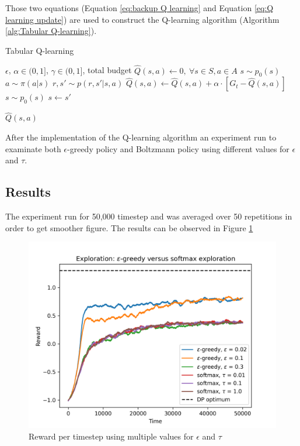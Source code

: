 \documentclass{article}
\begin{document}
Those two equations (Equation \ref{eq:backup Q learning} and Equation \ref{eq:Q learning update}) are used 
to construct the Q-learning algorithm (Algorithm \ref{alg:Tabular Q-learning}). 

\begin{algorithm}[h]
    \caption{Tabular Q-learning}
    \label{alg:Tabular Q-learning}
 \begin{algorithmic}
     $\epsilon $, $\alpha \in (0,1]$, $\gamma \in (0,1]$, total budget
    \STATE $\hat{Q}(s,a) \leftarrow 0,\ \forall s \in S, a \in A$
    \STATE $s \sim p_0(s)$
        \STATE $a \sim \pi(a|s)$
        \STATE $r,s' \sim p(r,s'|s,a)$
        \STATE $\hat{Q}(s,a) \leftarrow \hat{Q}(s,a) + \alpha \cdot [G_t - \hat{Q}(s,a)]$
        \STATE $s \sim  p_0(s)$
        \ELSE 
        \STATE $s \leftarrow s'$
        \ENDIF
        \ENDWHILE
    
     $\hat{Q}(s,a)$
 \end{algorithmic}
\end{algorithm}
 
After the implementation of the Q-learning algorithm an experiment run to examinate both $\epsilon$-greedy policy and Boltzmann policy using 
different values for $\epsilon$ and $\tau$.

\subsection{Results}
The experiment run for 50,000 timestep and was averaged over 50 repetitions in order to get smoother figure. The results can be observed in Figure \ref{fig:Exploration}

    \begin{figure}[H]
        \includegraphics[scale=0.6]{images/exploration.png}
        \caption{Reward per timestep using multiple values for $\epsilon$ and $\tau$ }
        \label{fig:Exploration}
    \end{figure}
\end{document}
